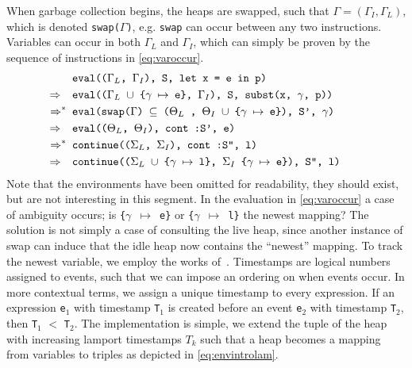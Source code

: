When garbage collection begins, the heaps are swapped, such that $\Gamma = (\Gamma_I, \Gamma_L)$, which is denoted \texttt{swap($\Gamma$)}, e.g. \texttt{swap} can occur between any two instructions.
Variables can occur in both $\Gamma_L$ and $\Gamma_I$, which can simply be proven by the sequence of instructions in \autoref{eq:varoccur}.
\begin{align}
	                            & \texttt{ eval(($\Gamma_L$, $\Gamma_I$), S, let x = e in p)} \label{eq:varoccur}                                           \\
	\Rightarrow\hspace*{0.18cm} & \texttt{ eval(($\Gamma_L$ $\cup$ \{$\gamma$ $\mapsto$ e\}, $\Gamma_I$), S, subst(x, $\gamma$, p))}\tag*{}                 \\
	\Rightarrow^*               & \texttt{ eval(swap($\Gamma$) $\subseteq$ ($\Theta_L$ , $\Theta_I$ $\cup$ \{$\gamma$ $\mapsto$ e\}), S', $\gamma$)}\tag*{} \\
	\Rightarrow\hspace*{0.18cm} & \texttt{ eval(($\Theta_L$, $\Theta_I$), cont :S', e)}\tag*{}                                                              \\
	\Rightarrow^*               & \texttt{ continue(($\Sigma_L$, $\Sigma_I$), cont :S'', l)}\tag*{}                                                         \\
	\Rightarrow\hspace*{0.18cm} & \texttt{ continue(($\Sigma_L$ $\cup$ \{$\gamma$ $\mapsto$ l\}, $\Sigma_I$ \{$\gamma$ $\mapsto$ e\}), S'', l)}\tag*{}
\end{align}
Note that the environments have been omitted for readability, they should exist, but are not interesting in this segment.
In the evaluation in \autoref{eq:varoccur} a case of ambiguity occurs; is \texttt{\{$\gamma$ $\mapsto$ e\}} or \texttt{\{$\gamma$ $\mapsto$ l\}} the newest mapping?
The solution is not simply a case of consulting the live heap, since another instance of swap can induce that the idle heap now contains the ``newest'' mapping.
To track the newest variable, we employ the works of~\cite{lamport}.
Timestamps are logical numbers assigned to events, such that we can impose an ordering on when events occur.
In more contextual terms, we assign a unique timestamp to every expression.
If an expression \texttt{e}$_1$ with timestamp \texttt{T}$_1$ is created before an event \texttt{e}$_2$ with timestamp \texttt{T}$_2$, then \texttt{T}$_1$ $<$ \texttt{T}$_2$.
The implementation is simple, we extend the tuple of the heap with increasing lamport timestamps $T_k$ such that a heap becomes a mapping from variables to triples as depicted in \autoref{eq:envintrolam}.
